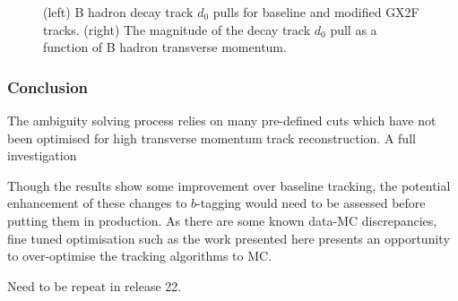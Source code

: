 \begin{figure}[!htbp]
\begin{subfigure}{.5\textwidth}
    \end{subfigure}
    \caption{(left) B hadron decay track $d_0$ pulls for baseline and modified GX2F tracks. (right) The magnitude of the decay track $d_0$ pull as a function of B hadron transverse momentum.}
    \label{fig:gx2f_opt_pulls}
\end{figure}




\subsubsection{Conclusion}

The ambiguity solving process relies on many pre-defined cuts which have not been optimised for high transverse momentum \bhadron track reconstruction.
A full investigation 


Though the results show some improvement over baseline tracking, the potential enhancement of these changes to $b$-tagging would need to be assessed before putting them in production. As there are some known data-MC discrepancies, fine tuned optimisation such as the work presented here presents an opportunity to over-optimise the tracking algorithms to MC.

Need to be repeat in release 22.

